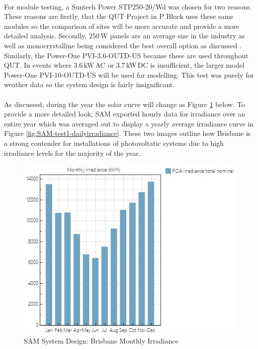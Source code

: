 \paragraph{}
For module testing, a Suntech Power STP250-20/Wd was chosen for two reasons. These reasons are firstly, that the QUT Project in P Block uses these same modules so the comparison of sites will be more accurate and provide a more detailed analysis. Secondly, 250\,W panels are an average size in the industry as well as monocrystalline being considered the best overall option as discussed \cite{Haberlin2012}. Similarly, the Power-One PVI-3.6-OUTD-US because these are used throughout QUT. In events where 3.6\,kW\,AC or 3.7\,kW\,DC is insufficient, the larger model Power-One PVI-10-OUTD-US will be used for modelling. This test was purely for weather data so the system design is fairly insignificant.  

\paragraph{}
As discussed, during the year the solar curve will change as Figure \ref{fig:SAM-test1-monthlyirradiance} below. To provide a more detailed look, SAM exported hourly data for irradiance over an entire year which was averaged out to display a yearly average irradiance curve in Figure \ref{fig:SAM-test1-dailyirradiance}. These two images outline how Brisbane is a strong contender for installations of photovoltatic systems due to high irradiance levels for the majority of the year.  

\begin{figure}[H]
	\hfill\includegraphics[width = 120mm]{images/sam/test1-monthlyirradiance}\hspace*{\fill}
	\caption{SAM System Design: Brisbane Monthly Irradiance} 
	\label{fig:SAM-test1-monthlyirradiance}
\end{figure}

